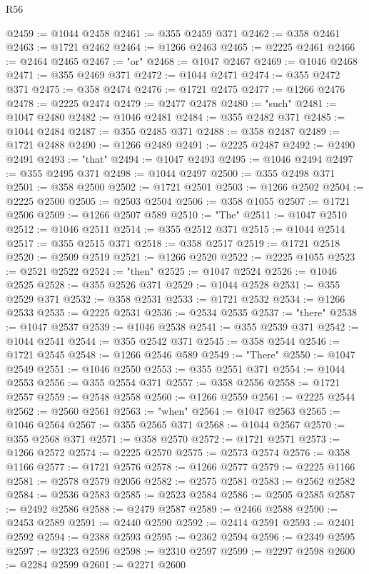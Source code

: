 \begin{lexlean}{R56}
\begin{coremodule}
@2459 := @1044 @2458
@2461 := @355 @2459 @371
@2462 := @358 @2461
@2463 := @1721 @2462
@2464 := @1266 @2463
@2465 := @2225 @2461
@2466 := @2464 @2465
@2467 := "or"
@2468 := @1047 @2467
@2469 := @1046 @2468
@2471 := @355 @2469 @371
@2472 := @1044 @2471
@2474 := @355 @2472 @371
@2475 := @358 @2474
@2476 := @1721 @2475
@2477 := @1266 @2476
@2478 := @2225 @2474
@2479 := @2477 @2478
@2480 := "such"
@2481 := @1047 @2480
@2482 := @1046 @2481
@2484 := @355 @2482 @371
@2485 := @1044 @2484
@2487 := @355 @2485 @371
@2488 := @358 @2487
@2489 := @1721 @2488
@2490 := @1266 @2489
@2491 := @2225 @2487
@2492 := @2490 @2491
@2493 := "that"
@2494 := @1047 @2493
@2495 := @1046 @2494
@2497 := @355 @2495 @371
@2498 := @1044 @2497
@2500 := @355 @2498 @371
@2501 := @358 @2500
@2502 := @1721 @2501
@2503 := @1266 @2502
@2504 := @2225 @2500
@2505 := @2503 @2504
@2506 := @358 @1055
@2507 := @1721 @2506
@2509 := @1266 @2507 @589
@2510 := "The"
@2511 := @1047 @2510
@2512 := @1046 @2511
@2514 := @355 @2512 @371
@2515 := @1044 @2514
@2517 := @355 @2515 @371
@2518 := @358 @2517
@2519 := @1721 @2518
@2520 := @2509 @2519
@2521 := @1266 @2520
@2522 := @2225 @1055
@2523 := @2521 @2522
@2524 := "then"
@2525 := @1047 @2524
@2526 := @1046 @2525
@2528 := @355 @2526 @371
@2529 := @1044 @2528
@2531 := @355 @2529 @371
@2532 := @358 @2531
@2533 := @1721 @2532
@2534 := @1266 @2533
@2535 := @2225 @2531
@2536 := @2534 @2535
@2537 := "there"
@2538 := @1047 @2537
@2539 := @1046 @2538
@2541 := @355 @2539 @371
@2542 := @1044 @2541
@2544 := @355 @2542 @371
@2545 := @358 @2544
@2546 := @1721 @2545
@2548 := @1266 @2546 @589
@2549 := "There"
@2550 := @1047 @2549
@2551 := @1046 @2550
@2553 := @355 @2551 @371
@2554 := @1044 @2553
@2556 := @355 @2554 @371
@2557 := @358 @2556
@2558 := @1721 @2557
@2559 := @2548 @2558
@2560 := @1266 @2559
@2561 := @2225 @2544
@2562 := @2560 @2561
@2563 := "when"
@2564 := @1047 @2563
@2565 := @1046 @2564
@2567 := @355 @2565 @371
@2568 := @1044 @2567
@2570 := @355 @2568 @371
@2571 := @358 @2570
@2572 := @1721 @2571
@2573 := @1266 @2572
@2574 := @2225 @2570
@2575 := @2573 @2574
@2576 := @358 @1166
@2577 := @1721 @2576
@2578 := @1266 @2577
@2579 := @2225 @1166
@2581 := @2578 @2579 @2056
@2582 := @2575 @2581
@2583 := @2562 @2582
@2584 := @2536 @2583
@2585 := @2523 @2584
@2586 := @2505 @2585
@2587 := @2492 @2586
@2588 := @2479 @2587
@2589 := @2466 @2588
@2590 := @2453 @2589
@2591 := @2440 @2590
@2592 := @2414 @2591
@2593 := @2401 @2592
@2594 := @2388 @2593
@2595 := @2362 @2594
@2596 := @2349 @2595
@2597 := @2323 @2596
@2598 := @2310 @2597
@2599 := @2297 @2598
@2600 := @2284 @2599
@2601 := @2271 @2600

\end{coremodule}
\end{lexlean}
